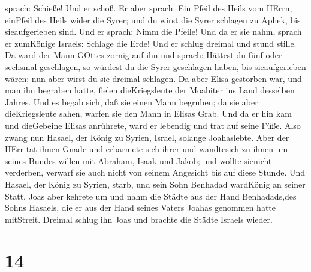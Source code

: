 sprach: Schieße! Und er schoß. Er aber sprach: Ein Pfeil des Heils vom
HErrn, einPfeil des Heils wider die Syrer; und du wirst die Syrer
schlagen zu Aphek, bis sieaufgerieben sind.  Und er sprach:
Nimm die Pfeile! Und da er sie nahm, sprach er zumKönige Israels:
Schlage die Erde! Und er schlug dreimal und stund stille. 
Da ward der Mann GOttes zornig auf ihn und sprach: Hättest du fünf-oder
sechsmal geschlagen, so würdest du die Syrer geschlagen haben, bis
sieaufgerieben wären; nun aber wirst du sie dreimal schlagen.
 Da aber Elisa gestorben war, und man ihn begraben hatte,
fielen dieKriegsleute der Moabiter ins Land desselben Jahres.
 Und es begab sich, daß sie einen Mann begruben; da sie
aber dieKriegsleute sahen, warfen sie den Mann in Elisas Grab. Und da er
hin kam und dieGebeine Elisas anrührete, ward er lebendig und trat auf
seine Füße.  Also zwang nun Hasael, der König zu Syrien,
Israel, solange Joahaslebte.  Aber der HErr tat ihnen Gnade
und erbarmete sich ihrer und wandtesich zu ihnen um seines Bundes willen
mit Abraham, Isaak und Jakob; und wollte sienicht verderben, verwarf sie
auch nicht von seinem Angesicht bis auf diese Stunde.  Und
Hasael, der König zu Syrien, starb, und sein Sohn Benhadad wardKönig an
seiner Statt.  Joas aber kehrete um und nahm die Städte aus
der Hand Benhadads,des Sohns Hasaels, die er aus der Hand seines Vaters
Joahas genommen hatte mitStreit. Dreimal schlug ihn Joas und brachte die
Städte Israels wieder.

\hypertarget{section-13}{%
\section{14}\label{section-13}}

